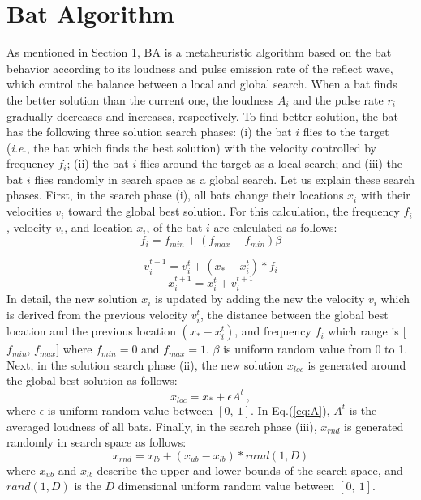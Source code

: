 \documentclass[conference]{IEEEtran}
\begin{document}
\section{Bat Algorithm}
As mentioned in Section 1, BA is a metaheuristic algorithm based on the bat behavior according to its loudness and pulse emission rate of the reflect wave, which control the balance between a local and global search. When a bat finds the better solution than the current one, the loudness $A_i$ and the pulse rate $r_i$ gradually decreases and increases, respectively. To find better solution, the bat has the following three solution search phases: (i) the bat $i$ flies to the target (\textit{i.e.}, the bat which finds the best solution) with the velocity controlled by frequency $f_i$; (ii) the bat $i$ flies around the target as a local search; and (iii) the bat $i$ flies randomly in search space as a global search.
Let us explain these search phases.
First, in the search phase (i), all bats change their locations $x_i$ with their velocities $v_i$ toward the global best solution. For this calculation, the frequency $f_i$, velocity $v_i$, and location $x_i$, of the bat $i$ are calculated as follows:
\begin{equation}
f_{i} =f_{min}+(f_{max}-f_{min}) \beta
\label{eq:freq} 
\end{equation}

\begin{equation}
v_i^{t+1}=v_i^t+(x_*-x_i^t)* f_i
\label{eq:vi}
\end{equation}
\begin{equation}
x_i^{t+1}=x_i^t+v_i^{t+1}
\label{eq:xi}
\end{equation}
In detail, the new solution $x_i$ is updated by adding the new the velocity ${v_i}$ which is derived from the previous velocity $v_i^t$, the distance between the global best location and the previous location $(x_*-x_i^t)$, and frequency $f_i$ which range is [${f_{min}}$, ${f_{max}}$] where ${f_{min}}=0$ and ${f_{max}}=1$. $\beta $ is uniform random value from 0 to 1. Next, in the solution search phase (ii), the new solution $x_{loc}$ is generated around the global best solution as follows:
\begin{equation}
x_{loc}=x_{*}+ \epsilon A^t \ ,
\label{eq:loc}
\end{equation}
where ${\epsilon}$ is uniform random value between ${[0,  \ 1]}$. In Eq.(\ref{eq:A}), ${A^t}$ is the averaged loudness of all bats. Finally, in the search phase (iii), $x_{rnd}$ is generated randomly in search space as follows:
\begin{equation}
\label{eq:xrnd}
x_{rnd}=x_{lb}+(x_{ub}-x_{lb})*rand(1,D)
\end{equation}
where $x_{ub}$ and $x_{lb}$ describe the upper and lower bounds of the search space, and $rand(1,D)$ is the $D$ dimensional uniform random value between $[0, \ 1]$. 
\end{document}
